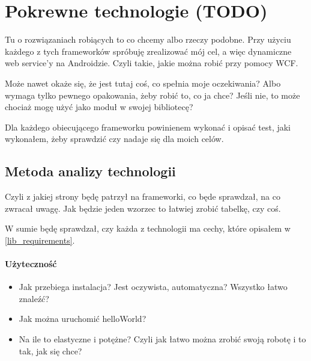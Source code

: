 \chapter{Pokrewne technologie (TODO)}
Tu o rozwiązaniach robiących to co chcemy albo rzeczy podobne. Przy użyciu każdego z tych frameworków spróbuję zrealizować mój cel, a więc dynamiczne web service'y na Androidzie. Czyli takie, jakie można robić przy pomocy WCF.

Może nawet okaże się, że jest tutaj coś, co spełnia moje oczekiwania? Albo wymaga tylko pewnego opakowania, żeby robić to, co ja chce?
Jeśli nie, to może chociaż mogę użyć jako moduł w swojej bibliotecę?

Dla każdego obiecującego frameworku powinienem wykonać i opisać test, jaki wykonałem, żeby sprawdzić czy nadaje się dla moich celów.



\section{Metoda analizy technologii}
Czyli z jakiej strony będę patrzył na frameworki, co będe sprawdzał, na co zwracał uwagę. Jak będzie jeden wzorzec to łatwiej zrobić tabelkę, czy coś.

W sumie będę sprawdzał, czy każda z technologii ma cechy, które opisałem w \ref{lib_requirements}.

\subsubsection{Użyteczność}
\begin{itemize}
	\item Jak przebiega instalacja? Jest oczywista, automatyczna? Wszystko łatwo znaleźć?
	\item Jak można uruchomić helloWorld?
	\item Na ile to elastyczne i potężne? Czyli jak łatwo można zrobić swoją robotę i to tak, jak się chce?
\end{itemize}

